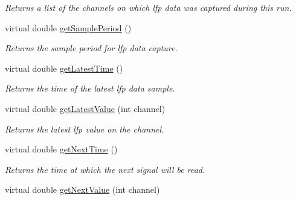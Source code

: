 \begin{DoxyCompactItemize}
\begin{DoxyCompactList}\small\item\em Returns a list of the channels on which lfp data was captured during this run. \end{DoxyCompactList}\item 
\hypertarget{class_picto_1_1_lfp_state_ad71f4b27e2033d1db0f9d4249ecfe969}{virtual double \hyperlink{class_picto_1_1_lfp_state_ad71f4b27e2033d1db0f9d4249ecfe969}{get\-Sample\-Period} ()}\label{class_picto_1_1_lfp_state_ad71f4b27e2033d1db0f9d4249ecfe969}

\begin{DoxyCompactList}\small\item\em Returns the sample period for lfp data capture. \end{DoxyCompactList}\item 
\hypertarget{class_picto_1_1_lfp_state_ad1f465d3d76d271547ae0e2780d13a79}{virtual double \hyperlink{class_picto_1_1_lfp_state_ad1f465d3d76d271547ae0e2780d13a79}{get\-Latest\-Time} ()}\label{class_picto_1_1_lfp_state_ad1f465d3d76d271547ae0e2780d13a79}

\begin{DoxyCompactList}\small\item\em Returns the time of the latest lfp data sample. \end{DoxyCompactList}\item 
\hypertarget{class_picto_1_1_lfp_state_a0ded796194c40a928d8fb7964a219b9d}{virtual double \hyperlink{class_picto_1_1_lfp_state_a0ded796194c40a928d8fb7964a219b9d}{get\-Latest\-Value} (int channel)}\label{class_picto_1_1_lfp_state_a0ded796194c40a928d8fb7964a219b9d}

\begin{DoxyCompactList}\small\item\em Returns the latest lfp value on the channel. \end{DoxyCompactList}\item 
\hypertarget{class_picto_1_1_lfp_state_a3659adcfc65cde8be1971b8a2f99f3e4}{virtual double \hyperlink{class_picto_1_1_lfp_state_a3659adcfc65cde8be1971b8a2f99f3e4}{get\-Next\-Time} ()}\label{class_picto_1_1_lfp_state_a3659adcfc65cde8be1971b8a2f99f3e4}

\begin{DoxyCompactList}\small\item\em Returns the time at which the next signal will be read. \end{DoxyCompactList}\item 
\hypertarget{class_picto_1_1_lfp_state_abe82e38a76a81290dbf209f8e7fce747}{virtual double \hyperlink{class_picto_1_1_lfp_state_abe82e38a76a81290dbf209f8e7fce747}{get\-Next\-Value} (int channel)}\label{class_picto_1_1_lfp_state_abe82e38a76a81290dbf209f8e7fce747}


\end{DoxyCompactItemize}
